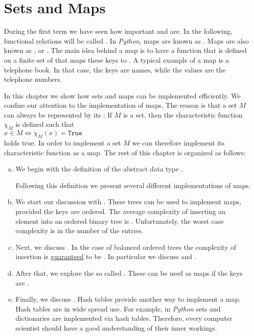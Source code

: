 \chapter{Sets and Maps}
During the first term we have seen how important  and  are.  In the
following, functional relations will be called .  In \textsl{Python}, maps are known as
.  Maps are also known as
\href{https://en.wikipedia.org/wiki/Associative_array}{},  or .
The main idea behind a map is to have a function that is defined on a finite set of  that
maps these keys to .  A typical example of a map is a telephone book.  In that case, the keys
are names, while the values are the telephone numbers.

In this chapter we show how sets and
maps can be implemented efficiently.  We confine our attention to the implementation of maps.  The
reason is that a set $M$ can always be represented by its :  If $M$ is
a set, then the characteristic function $\chi_M$ is defined such that
\\[0.2cm]
\hspace*{1.3cm}
$x \in M \Leftrightarrow \chi_M(x) = \mathtt{True}$
\\[0.2cm]
holds true.  In order to implement a set $M$ we can therefore implement its characteristic function
as a map.  The rest of this chapter is organized as follows:
\begin{enumerate}[(a)]
\item We begin with the definition of the abstract data type . 
    
      Following this definition we present several different implementations of maps. 
\item We start our discussion with .  These trees can be used to implement maps,
      provided the keys are ordered.        The average complexity of inserting
      an element into an ordered binary tree is .  Unfortunately, the worst case complexity
      is  in the number of the entries.
\item Next, we discuss .  In the case of balanced ordered trees the
      complexity of insertion is g\underline{uaranteed} to be .
      In particular we discuss  and .
\item After that, we explore the so called .  These can be used as maps if the keys are
      . 
\item Finally, we discuss .  Hash tables provide another way to implement a map.
      Hash tables are in wide spread use.  For example, in \textsl{Python} sets and dictionaries are
      implemented via hash tables.  Therefore, every computer scientist should have a good understanding of
      their inner workings. 
\end{enumerate}

